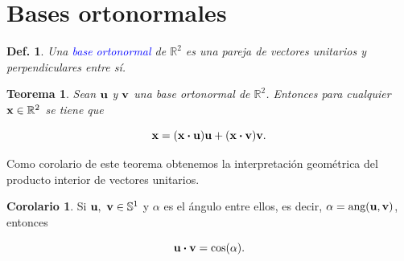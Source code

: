 \documentclass{article}
\theoremstyle{definicion}
\newtheorem{definicion}{Def.}
\theoremstyle{definition}             %
\theoremstyle{definition}             %
\theoremstyle{definition}
\theoremstyle{definition}
\theoremstyle{observacion}
\theoremstyle{definition}
\theoremstyle{plain}
\newtheorem{theorem}{Teorema}
\theoremstyle{definition}
\theoremstyle{afirmacion}
\newtheorem{corollary}{Corolario}
\theoremstyle{notation}
\theoremstyle{definition}
\begin{document}
        \section{Bases ortonormales}

        \begin{definicion}
            Una \textcolor{blue}{base ortonormal} de \(\mathbb{R}^{2}\) es una pareja de vectores unitarios y perpendiculares entre sí.
        \end{definicion}

        \begin{theorem}
            Sean \(\vb{u}\) y \(\vb{v}\) una base ortonormal de \(\mathbb{R}^{2}\).  Entonces para cualquier \(\vb{x} \in \mathbb{R}^{2}\) se tiene que

            \begin{equation*}
                \vb{x} = (\vb{x} \vdot \vb{u}) \vb{u} + (\vb{x} \vdot \vb{v}) \vb{v}.
            \end{equation*}
        \end{theorem}

        Como corolario de este teorema obtenemos la interpretación geométrica del producto interior de vectores unitarios.

        \begin{corollary}
            Si \(\vb{u},\ \vb{v} \in \mathbb{S}^{1}\) y \(\alpha\) es el ángulo entre ellos,  es decir, \(\alpha = \textrm{ang}(\vb{u}, \vb{v})\), entonces

            \begin{equation*}
                \vb{u} \vdot \vb{v} = \cos(\alpha).
            \end{equation*}
        \end{corollary}
\end{document}
